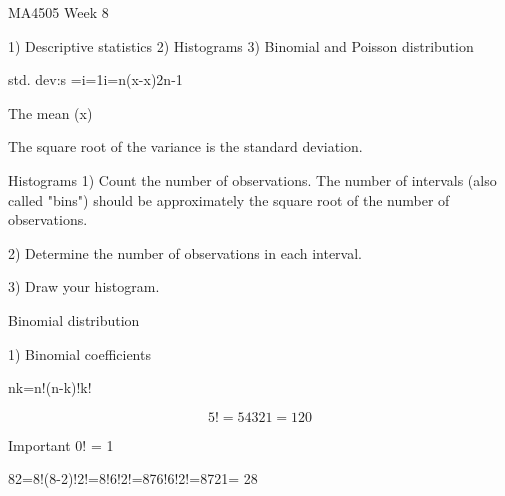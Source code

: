 MA4505 Week 8 

1) Descriptive statistics
2) Histograms
3) Binomial and Poisson distribution

std. dev:s =i=1i=n(x-x)2n-1



The mean (x) 


The square root of the variance is the standard deviation.


Histograms
1) Count the number of observations. The number of intervals (also called "bins") should be approximately the square root of the number of observations.

2) Determine the number of observations in each interval.

3) Draw your histogram.

Binomial distribution

1) Binomial coefficients

nk=n!(n-k)!k!


\[5! = 54321 = 120\]
	
Important 0! = 1

82=8!(8-2)!2!=8!6!2!=876!6!2!=8721= 28







